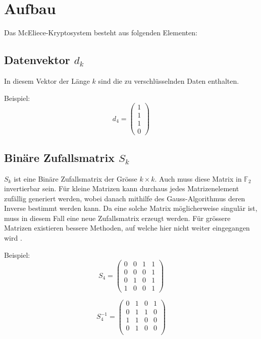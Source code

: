 %
%
%
\section{Aufbau\label{mceliece:section:Aufbau}}
Das McEliece-Kryptosystem besteht aus folgenden Elementen:

\subsection{Datenvektor $d_k$
\label{mceliece:subsection:d_k}}
In diesem Vektor der Länge $k$ sind die zu verschlüsselnden Daten enthalten.

Beispiel:
\[d_4=
\begin{pmatrix}
    1\\
    1\\
    1\\
    0 
\end{pmatrix}
\]

\subsection{Binäre Zufallsmatrix $S_k$
\label{mceliece:subsection:s_k}}
$S_k$ ist eine Binäre Zufallsmatrix der Grösse $k \times k$.
Auch muss diese Matrix in $\mathbb{F}_2$ invertierbar sein.
Für kleine Matrizen kann durchaus jedes Matrizenelement zufällig generiert werden,
wobei danach mithilfe des Gauss-Algorithmus deren Inverse bestimmt werden kann.
Da eine solche Matrix möglicherweise singulär ist, muss in diesem Fall eine neue Zufallsmatrix erzeugt werden.
Für grössere Matrizen existieren bessere Methoden, auf welche hier nicht weiter eingegangen wird \cite{mceliece:GenerationRandMatrix}.

Beispiel:
\[S_4=
    \begin{pmatrix}
        0 & 0 & 1 & 1\\
        0 & 0 & 0 & 1\\
        0 & 1 & 0 & 1\\
        1 & 0 & 0 & 1
    \end{pmatrix}
\]

\[
    S_4^{-1}=
    \begin{pmatrix}
        0 & 1 & 0 & 1\\
        0 & 1 & 1 & 0\\
        1 & 1 & 0 & 0\\
        0 & 1 & 0 & 0\\
    \end{pmatrix}
\]

